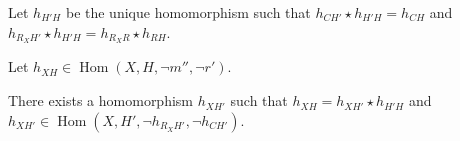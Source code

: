 \begin{lemma}
    \label{lem:2_exist}






    Let $h_{H'H}$ be the unique homomorphism such that $h_{CH'} \star h_{H'H} = h_{CH}$ and $h_{R_XH'} \star h_{H'H} = h_{R_XR} \star h_{RH}$.


    Let $h_{XH} \in \operatorname{Hom}(X, H, \lnot m'', \lnot r')$.
    
    There exists a homomorphism $h_{XH'}$ such that $h_{XH} = h_{XH'} \star h_{H'H}$ and $h_{XH'} \in \operatorname{Hom}(X, H', \lnot h_{R_XH'}, \lnot h_{CH'})$.
    

\end{lemma}

